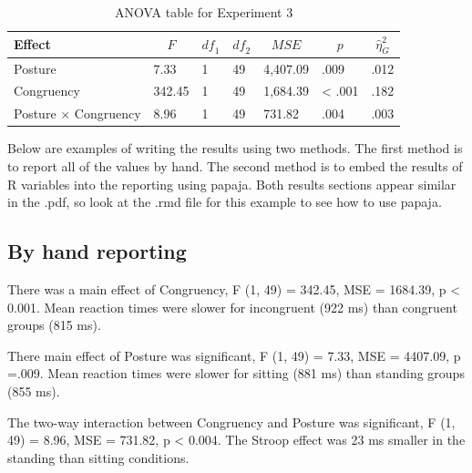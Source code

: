 \documentclass[
  english,
  man]{apa6}
\begin{document}
\begin{table}[tbp]

\begin{center}
\begin{threeparttable}

\caption{\label{tab:aovtable}ANOVA table for Experiment 3}

\begin{tabular}{lllllll}
\toprule
Effect & \multicolumn{1}{c}{$F$} & \multicolumn{1}{c}{$\mathit{df}_1$} & \multicolumn{1}{c}{$\mathit{df}_2$} & \multicolumn{1}{c}{$\mathit{MSE}$} & \multicolumn{1}{c}{$p$} & \multicolumn{1}{c}{$\hat{\eta}^2_G$}\\
\midrule
Posture & 7.33 & 1 & 49 & 4,407.09 & .009 & .012\\
Congruency & 342.45 & 1 & 49 & 1,684.39 & < .001 & .182\\
Posture $\times$ Congruency & 8.96 & 1 & 49 & 731.82 & .004 & .003\\
\bottomrule
\end{tabular}

\end{threeparttable}
\end{center}

\end{table}

Below are examples of writing the results using two methods. The first method is to report all of the values by hand. The second method is to embed the results of R variables into the reporting using papaja. Both results sections appear similar in the .pdf, so look at the .rmd file for this example to see how to use papaja.

\hypertarget{by-hand-reporting}{%
\subsection{By hand reporting}\label{by-hand-reporting}}

There was a main effect of Congruency, F (1, 49) = 342.45, MSE = 1684.39, p \textless{} 0.001. Mean reaction times were slower for incongruent (922 ms) than congruent groups (815 ms).

There main effect of Posture was significant, F (1, 49) = 7.33, MSE = 4407.09, p =.009. Mean reaction times were slower for sitting (881 ms) than standing groups (855 ms).

The two-way interaction between Congruency and Posture was significant, F (1, 49) = 8.96, MSE = 731.82, p \textless{} 0.004. The Stroop effect was 23 ms smaller in the standing than sitting conditions.
\end{document}
